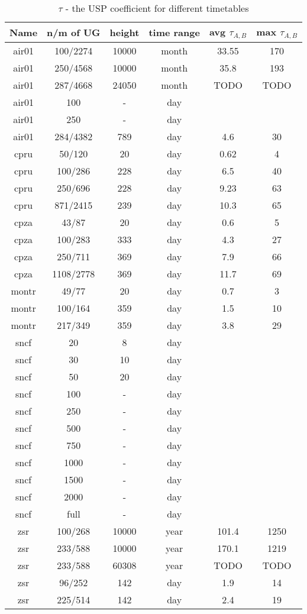	\begin{table}{
		\scriptsize
		\begin{tabular}{c|c|c|c|c|c}
			\hline
			\rowcolor{tablehead}
			\textbf{Name} & \textbf{n/m of UG} & \textbf{height} & \textbf{time range} & \textbf{avg $\tau_{A, B}$} & \textbf{max $\tau_{A, B}$} \\
			\hline
			air01 & 100/2274 & 10000 & month & 33.55 & 170 \\
			air01 & 250/4568 & 10000 & month & 35.8 & 193 \\
			air01 & 287/4668 & 24050 & month & TODO & TODO \\
			air01 & 100 & - & day &  &  \\
			air01 & 250 & - & day &  &  \\
			air01 & 284/4382 & 789 & day & 4.6 & 30 \\
			\hline
			cpru & 50/120 & 20 & day & 0.62 & 4 \\
			cpru & 100/286 & 228 & day & 6.5 & 40 \\
			cpru & 250/696 & 228 & day & 9.23 & 63 \\
			cpru & 871/2415 & 239 & day & 10.3 & 65 \\
			\hline
			cpza & 43/87 & 20 & day & 0.6 & 5 \\
			cpza & 100/283 & 333 & day & 4.3 & 27 \\
			cpza & 250/711 & 369 & day & 7.9 & 66 \\
			cpza & 1108/2778 & 369 & day & 11.7 & 69 \\
			\hline
			montr & 49/77 & 20 & day & 0.7 & 3 \\
			montr & 100/164 & 359 & day & 1.5 & 10 \\
			montr & 217/349 & 359 & day & 3.8 & 29 \\
			\hline
			sncf & 20 & 8 & day &  &  \\
			sncf & 30 & 10 & day &  &  \\
			sncf & 50 & 20 & day &  &  \\
			sncf & 100 & - & day &  &  \\
			sncf & 250 & - & day &  &  \\
			sncf & 500 & - & day &  &  \\
			sncf & 750 & - & day &  &  \\
			sncf & 1000 & - & day &  &  \\
			sncf & 1500 & - & day &  &  \\
			sncf & 2000 & - & day &  &  \\
			sncf & full & - & day &  &  \\
			\hline
			zsr & 100/268 & 10000 & year & 101.4 & 1250 \\
			zsr & 233/588 & 10000 & year & 170.1 & 1219 \\
			zsr & 233/588 & 60308 & year & TODO & TODO \\
			zsr & 96/252 & 142 & day & 1.9 & 14 \\
			zsr & 225/514 & 142 & day & 2.4 & 19 \\
		\end{tabular}}
		\caption{\label{tab:usps}$\tau$ - the USP coefficient for different timetables}
		\normalsize
	\end{table}
	
